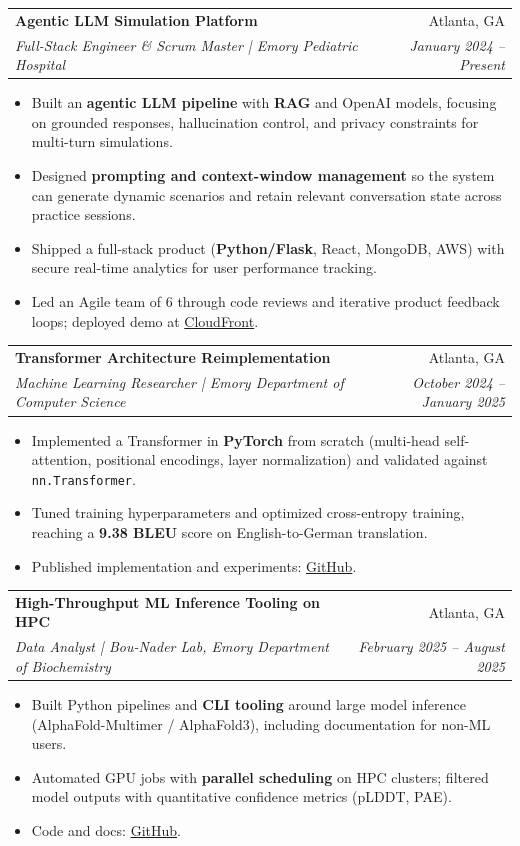 \documentclass[a4paper,10pt]{article}
\makeatletter
\newcommand{\resumeSubheading}[4]{
  \vspace{-1pt}\item
    \begin{tabular*}{0.97\textwidth}{l@{\extracolsep{\fill}}r}
      \textbf{#1} & #2 \\
      \textit{#3} & \textit{#4} \\
    \end{tabular*}\vspace{-5pt}
}
\newcommand{\resumeItemListStart}{\begin{itemize}}
\newcommand{\resumeItemListEnd}{\end{itemize}\vspace{-6pt}}
\makeatother
\begin{document}
  \resumeSubheading
    {Agentic LLM Simulation Platform}{Atlanta, GA}
    {Full-Stack Engineer \& Scrum Master | Emory Pediatric Hospital}{January 2024 -- Present}
    \resumeItemListStart
      \item Built an \textbf{agentic LLM pipeline} with \textbf{RAG} and OpenAI models, focusing on grounded responses, hallucination control, and privacy constraints for multi-turn simulations.
      \item Designed \textbf{prompting and context-window management} so the system can generate dynamic scenarios and retain relevant conversation state across practice sessions.
      \item Shipped a full-stack product (\textbf{Python/Flask}, React, MongoDB, AWS) with secure real-time analytics for user performance tracking.
      \item Led an Agile team of 6 through code reviews and iterative product feedback loops; deployed demo at \href{https://d3g1qw60hz7yw7.cloudfront.net}{CloudFront}.
    \resumeItemListEnd

  \resumeSubheading
    {Transformer Architecture Reimplementation}{Atlanta, GA}
    {Machine Learning Researcher | Emory Department of Computer Science}{October 2024 -- January 2025}
    \resumeItemListStart
      \item Implemented a Transformer in \textbf{PyTorch} from scratch (multi-head self-attention, positional encodings, layer normalization) and validated against \texttt{nn.Transformer}.
      \item Tuned training hyperparameters and optimized cross-entropy training, reaching a \textbf{9.38 BLEU} score on English-to-German translation.
      \item Published implementation and experiments: \href{https://github.com/JunyiZhou-Conny/Reimplementation-of-Transformer}{GitHub}.
    \resumeItemListEnd

  \resumeSubheading
    {High-Throughput ML Inference Tooling on HPC}{Atlanta, GA}
    {Data Analyst | Bou-Nader Lab, Emory Department of Biochemistry}{February 2025 -- August 2025}
    \resumeItemListStart
      \item Built Python pipelines and \textbf{CLI tooling} around large model inference (AlphaFold-Multimer / AlphaFold3), including documentation for non-ML users.
      \item Automated GPU jobs with \textbf{parallel scheduling} on HPC clusters; filtered model outputs with quantitative confidence metrics (pLDDT, PAE).
      \item Code and docs: \href{https://github.com/JunyiZhou-Conny/AlphaFold-Bou-Nader-Lab}{GitHub}.
    \resumeItemListEnd
\end{document}
